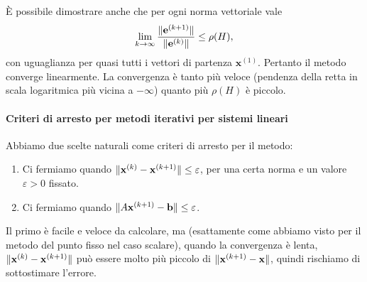 \documentclass[a4paper]{report}
\DeclarePairedDelimiter{\norm}{\lVert}{\rVert}
\newtheorem{theorem}{Teorema}[chapter]
\theoremstyle{definiton}
\theoremstyle{remark}
\newcommand{\x}{\mathbf{x}}
\newcommand{\e}{\mathbf{e}}
\renewcommand{\b}{\mathbf{b}}
\begin{document}
È possibile dimostrare anche che per ogni norma vettoriale vale
\[
\lim_{k\to\infty} \frac{\norm{\e^{(k+1)}}}{\norm{\e^{(k)}}} \leq \rho(H),
\]
con uguaglianza per quasi tutti i vettori di partenza $\x^{(1)}$. Pertanto il metodo converge linearmente. La convergenza è tanto più veloce (pendenza della retta in scala logaritmica più vicina a $-\infty$) quanto più $\rho(H)$ è piccolo.

\paragraph{Criteri di arresto per metodi iterativi per sistemi lineari}
Abbiamo due scelte naturali come criteri di arresto per il metodo:
\begin{enumerate}
    \item Ci fermiamo quando $\norm{\x^{(k)} - \x^{(k+1)}} \leq \varepsilon$, per una certa norma e un valore $\varepsilon > 0$ fissato.
    \item Ci fermiamo quando $\norm{A \x^{(k+1)} - \b} \leq \varepsilon$.
\end{enumerate}
Il primo è facile e veloce da calcolare, ma (esattamente come abbiamo visto per il metodo del punto fisso nel caso scalare), quando la convergenza è lenta, $\norm{\x^{(k)} - \x^{(k+1)}}$ può essere molto più piccolo di $\norm{\x^{(k+1)} - \x}$, quindi rischiamo di sottostimare l'errore.


\end{document}
